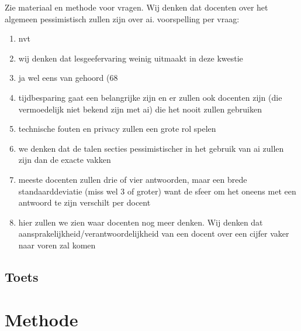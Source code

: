 \documentclass[12pt]{article}
\begin{document}
\begin{multicols}{2}
Zie materiaal en methode voor vragen.
Wij denken dat docenten over het algemeen pessimistisch zullen zijn over ai. 
voorspelling per vraag:
\begin{enumerate}
\item nvt
\item wij denken dat lesgeefervaring weinig uitmaakt in deze kwestie
\item ja wel eens van gehoord (68%
\item tijdbesparing gaat een belangrijke zijn en er zullen ook docenten zijn (die vermoedelijk niet bekend zijn met ai) die het nooit zullen gebruiken
\item technische fouten en privacy zullen een grote rol spelen
\item we denken dat de talen secties pessimistischer in het gebruik van ai zullen zijn dan de exacte vakken
\item meeste docenten zullen drie of vier antwoorden, maar een brede standaarddeviatie (miss wel 3 of groter) want de sfeer om het oneens met een antwoord te zijn verschilt per docent
\item hier zullen we zien waar docenten nog meer denken. Wij denken dat aansprakelijkheid/verantwoordelijkheid van een docent over een cijfer vaker naar voren zal komen
\end{enumerate}
\end{multicols}

\pagebreak
\subsection{Toets}
\pagebreak

\section{Methode}
\end{document}

